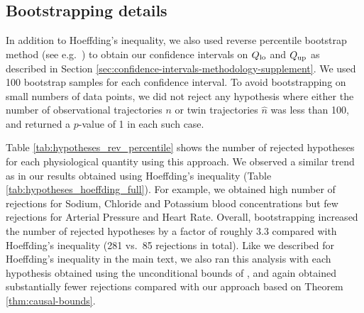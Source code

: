 \subsection{Bootstrapping details} \label{sec:boostrapping-details-supplement}

In addition to Hoeffding's inequality, we also used reverse percentile bootstrap method (see e.g.\ \cite{hesterberg2015what}) to obtain our confidence intervals on $Q_{\mathrm{lo}}$ and $Q_{\mathrm{up}}$ as described in Section \ref{sec:confidence-intervals-methodology-supplement}.
We used 100 bootstrap samples for each confidence interval.
To avoid bootstrapping on small numbers of data points, we did not reject any hypothesis where either the number of observational trajectories $n$ or twin trajectories $\widehat{n}$ was less than 100, and returned a $p$-value of 1 in each such case.

Table \ref{tab:hypotheses_rev_percentile} shows the number of rejected hypotheses for each physiological quantity using this approach.
We observed a similar trend as in our results obtained using Hoeffding's inequality (Table \ref{tab:hypotheses_hoeffding_full}).
For example, we obtained high number of rejections for Sodium, Chloride and Potassium blood concentrations but few rejections for Arterial Pressure and Heart Rate.
Overall, bootstrapping increased the number of rejected hypotheses by a factor of roughly 3.3 compared with Hoeffding's inequality (281 vs.\ 85 rejections in total).
Like we described for Hoeffding's inequality in the main text, we also ran this analysis with each hypothesis obtained using the unconditional bounds of \cite{manski}, and again obtained substantially fewer rejections compared with our approach based on Theorem \ref{thm:causal-bounds}.





